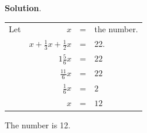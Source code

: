 \documentclass{book}
\begin{document}
\begin{center}
\textbf{ Solution}.
\end{center}
\begin{center}
\begin{tabular}{l r c l}
Let & $x$ &=& the number.\\
& $x + \frac{1}{3}x + \frac{1}{2}x $ &=& 22.\\
& $1\frac{5}{6}x$ &=& $22$\\
& $\frac{11}{6}x $&=& $22$\\
& $\frac{1}{6}x $&=& $2$\\
& $x$&=& $12$\\
\end{tabular}
\end{center}

The number is 12.
\end{document}
